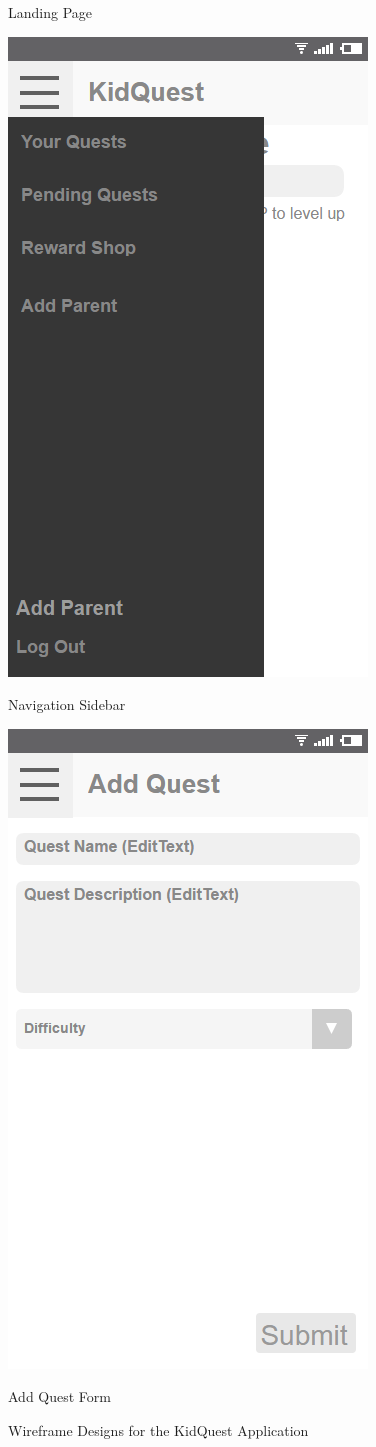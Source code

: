 \begin{figure}[ht]
\begin{minipage}[b]{0.5\linewidth}
    \caption{Landing Page} 
    \vspace{4ex}
  \end{minipage} 
  \begin{minipage}[b]{0.5\linewidth}
    \centering
    \includegraphics[width=.5\linewidth, frame]{../images/Wireframes/NavigationScreen.png}
    \caption{Navigation Sidebar} 
    \vspace{4ex}
  \end{minipage}%
  \begin{minipage}[b]{0.5\linewidth}
    \centering
    \includegraphics[width=.5\linewidth, frame]{../images/Wireframes/AddQuestScreen.png}
    \caption{Add Quest Form} 
    \vspace{4ex}
  \end{minipage} 
  \caption{Wireframe Designs for the KidQuest Application}
\end{figure}